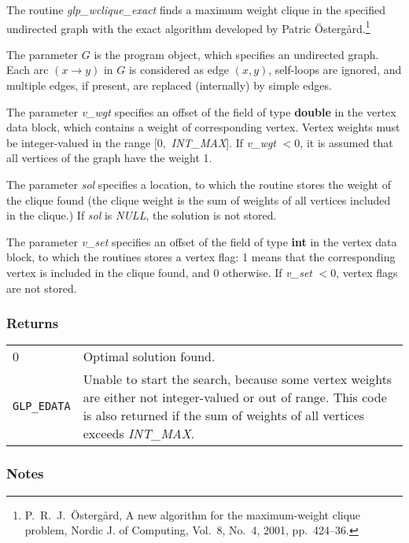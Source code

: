 \documentclass[dvipdfm,11pt]{report}
\begin{document}
The routine {\it glp\_wclique\_exact} finds a maximum weight clique in
the specified undirected graph with the exact algorithm developed by
Patric \"Osterg{\aa}rd.\footnote{P.~R.~J.~\"Osterg{\aa}rd, A new
algorithm for the maximum-weight clique problem, Nordic J. of Computing,
Vol.~8, No.~4, 2001, pp.~424--36.}

The parameter $G$ is the program object, which specifies an undirected
graph. Each arc $(x\rightarrow y)$ in $G$ is considered as edge
$(x,y)$, self-loops are ignored, and multiple edges, if present, are
replaced (internally) by simple edges.

The parameter {\it v\_wgt} specifies an offset of the field of type
{\bf double} in the vertex data block, which contains a weight of
corresponding vertex. Vertex weights must be integer-valued in the
range $[0,$ {\it INT\_MAX}$]$. If {\it v\_wgt} $<0$, it is assumed that
all vertices of the graph have the weight 1.

The parameter {\it sol} specifies a location, to which the routine
stores the weight of the clique found (the clique weight is the sum
of weights of all vertices included in the clique.) If {\it sol} is
{\it NULL}, the solution is not stored.

The parameter {\it v\_set} specifies an offset of the field of type
{\bf int} in the vertex data block, to which the routines stores a
vertex flag: 1 means that the corresponding vertex is included in the
clique found, and 0 otherwise. If {\it v\_set} $<0$, vertex flags are
not stored.

\subsubsection*{Returns}

\def\arraystretch{1}

\begin{tabular}{@{}p{25mm}p{97.3mm}@{}}
0 & Optimal solution found.\\
\verb|GLP_EDATA| & Unable to start the search, because some vertex
weights are either not integer-valued or out of range. This code is
also returned if the sum of weights of all vertices exceeds
{\it INT\_MAX}. \\
\end{tabular}

\subsubsection*{Notes}
\end{document}
